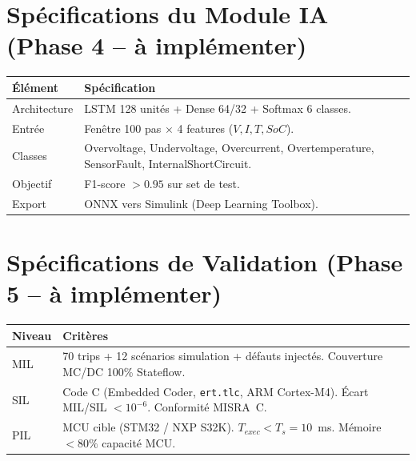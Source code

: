\documentclass[a4paper,11pt]{article}
\begin{document}
\section{Spécifications du Module IA (Phase 4 -- à implémenter)}

\begin{center}
\renewcommand{\arraystretch}{1.4}
\begin{tabular}{p{4cm} p{8.5cm}}
\toprule
\textbf{Élément} & \textbf{Spécification} \\
\midrule
Architecture &
  LSTM 128 unités + Dense 64/32 + Softmax 6 classes. \\
Entrée &
  Fenêtre 100 pas $\times$ 4 features ($V, I, T, SoC$). \\
Classes &
  Overvoltage, Undervoltage, Overcurrent, Overtemperature,
  SensorFault, InternalShortCircuit. \\
Objectif &
  F1-score $> 0.95$ sur set de test. \\
Export &
  ONNX vers Simulink (Deep Learning Toolbox). \\
\bottomrule
\end{tabular}
\end{center}

\section{Spécifications de Validation (Phase 5 -- à implémenter)}

\begin{center}
\renewcommand{\arraystretch}{1.4}
\begin{tabular}{p{3cm} p{9.5cm}}
\toprule
\textbf{Niveau} & \textbf{Critères} \\
\midrule
MIL &
  70 trips + 12 scénarios simulation + défauts injectés.
  Couverture MC/DC 100\% Stateflow. \\
SIL &
  Code C (Embedded Coder, \texttt{ert.tlc}, ARM Cortex-M4).
  Écart MIL/SIL $< 10^{-6}$. Conformité MISRA~C. \\
PIL &
  MCU cible (STM32 / NXP S32K). $T_{exec} < T_s = 10$~ms.
  Mémoire $< 80\%$ capacité MCU. \\
\bottomrule
\end{tabular}
\end{center}
\end{document}
